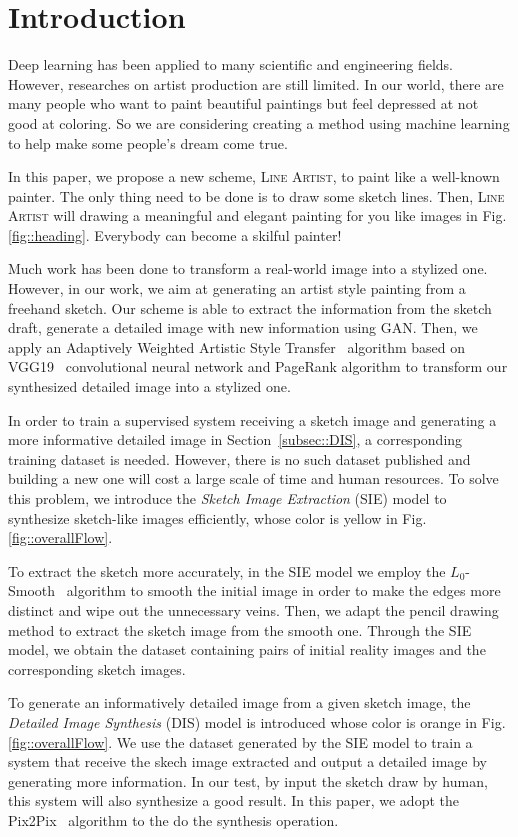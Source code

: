 \documentclass[10pt,twocolumn,letterpaper]{article}
\begin{document}
\section{Introduction}
Deep learning has been applied to many scientific and engineering fields. However, researches on artist production are still limited. In our world, there are many people who want to paint beautiful paintings but feel depressed at not good at coloring. So we are considering creating a method using machine learning to help make some people's dream come true.

In this paper, we propose a new scheme, \textsc{Line Artist}, to paint like a well-known painter. The only thing need to be done is to draw some sketch lines. Then, \textsc{Line Artist} will drawing a meaningful and elegant painting for you like images in Fig.\ref{fig::heading}. Everybody can become a skilful painter!

Much work has been done to transform a real-world image into a stylized one. However, in our work, we aim at generating an artist style painting from a freehand sketch. Our scheme is able to extract the information from the sketch draft, generate a detailed image with new information using GAN. Then, we apply an Adaptively Weighted Artistic Style Transfer~\cite{gatys2015neural} algorithm based on VGG19~\cite{simonyan2014very} convolutional neural network and PageRank algorithm to transform our synthesized detailed image into a stylized one.

In order to train a supervised system receiving a sketch image and generating a more informative detailed image in Section~\ref{subsec::DIS}, a corresponding training dataset is needed. However, there is no such dataset published and building a new one will cost a large scale of time and human resources. To solve this problem, we introduce the \textit{Sketch Image Extraction} (SIE) model to synthesize sketch-like images efficiently, whose color is yellow in Fig.\ref{fig::overallFlow}.

To extract the sketch more accurately, in the SIE model we employ the $L_0$-Smooth~\cite{xu2011image} algorithm to smooth the initial image in order to make the edges more distinct and wipe out the unnecessary veins. Then, we adapt the pencil drawing~\cite{lu2012combining} method to extract the sketch image from the smooth one. Through the SIE model, we obtain the dataset containing pairs of initial reality images and the corresponding sketch images.

To generate an informatively detailed image from a given sketch image, the \textit{Detailed Image Synthesis} (DIS) model is introduced whose color is orange in Fig.\ref{fig::overallFlow}. We use the dataset generated by the SIE model to train a system that receive the skech image extracted and output a detailed image by generating more information. In our test, by input the sketch draw by human, this system will also synthesize a good result. In this paper, we adopt the Pix2Pix~\cite{isola2016image} algorithm to the do the synthesis operation.
\end{document}
